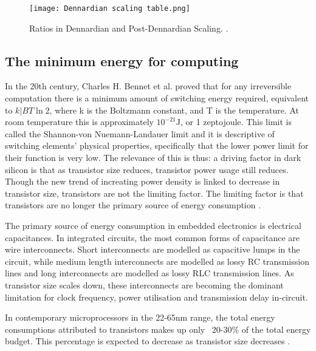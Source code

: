 		
			\begin{figure}
				
				\begin{center}
					\texttt{[image: Dennardian scaling table.png]}
					
					\caption{Ratios in Dennardian and Post-Dennardian Scaling. \cite{TheEndOfMooreTheis}.}
				\end{center}
				\label{DennardianScalingTable}
			\end{figure}
			
		\subsection{The minimum energy for computing}
		
			In the 20th century, Charles H. Bennet et al. proved that for any irreversible computation there is a minimum amount of switching energy required, equivalent to $k|{B}T\ln{2}$, where k is the Boltzmann constant, and T is the temperature. At room temperature this is approximately $10^{-21}$J, or 1 zeptojoule. This limit is called the Shannon-von Nuemann-Landauer limit and it is descriptive of switching elements' physical properties, specifically that the lower power limit for their function is very low. The relevance of this is thus: a driving factor in dark silicon is that as transistor size reduces, transistor power usage still reduces. Though the new trend of increating power density is linked to decrease in transistor size, transistors are not the limiting factor. The limiting factor is that transistors are no longer the primary source of energy consumption \cite{MinEnergyInComputing}.
			
			The primary source of energy consumption in embedded electronics is electrical capacitances. In integrated circuits, the most common forms of capacitance are wire interconnects. Short interconnects are modelled as capacitive lumps in the circuit, while medium length interconnects are modelled as lossy RC transmission lines and long interconnects are modelled as lossy RLC transmission lines. As transistor size scales down, these interconnects are becoming the dominant limitation for clock frequency, power utilisation and transmission delay in-circuit.
			
			In contemporary microprocessors in the 22-65nm range, the total energy consumptions attributed to transistors makes up only ~20-30\% of the total energy budget. This percentage is expected to decrease as transistor size decreases \cite{MinEnergyInComputing, Interconnects}. 
		

